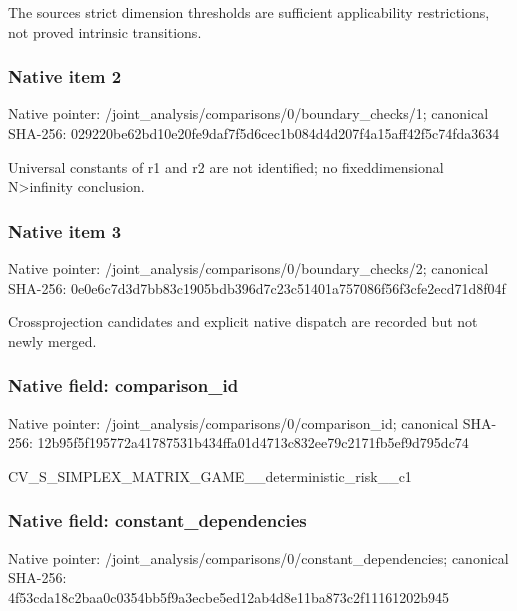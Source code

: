 \documentclass[10pt,a4paper]{article}
\begin{document}
The sources strict dimension thresholds are sufficient applicability restrictions, not proved intrinsic transitions.


\subsubsection{Native item 2}


Native pointer: /joint\_analysis/comparis\allowbreak{}ons/0/boundary\_checks/1; canonical SHA-256: 029220be62bd10e20fe9daf7\allowbreak{}f5d6cec1b084d4d207f4a15a\allowbreak{}ff42f5c74fda3634


Universal constants of r1 and r2 are not identified; no fixeddimensional N>infinity conclusion.


\subsubsection{Native item 3}


Native pointer: /joint\_analysis/comparis\allowbreak{}ons/0/boundary\_checks/2; canonical SHA-256: 0e0e6c7d3d7bb83c1905bdb3\allowbreak{}96d7c23c51401a757086f56f\allowbreak{}3cfe2ecd71d8f04f


Crossprojection candidates and explicit native dispatch are recorded but not newly merged.


\subsubsection{Native field: comparison\_id}


Native pointer: /joint\_analysis/comparis\allowbreak{}ons/0/comparison\_id; canonical SHA-256: 12b95f5f195772a41787531b\allowbreak{}434ffa01d4713c832ee79c21\allowbreak{}71fb5ef9d795dc74


CV\_S\_SIMPLEX\_MATRIX\_GAME\allowbreak{}\_\_deterministic\_risk\_\_c1


\subsubsection{Native field: constant\_dependencies}


Native pointer: /joint\_analysis/comparis\allowbreak{}ons/0/constant\_dependenc\allowbreak{}ies; canonical SHA-256: 4f53cda18c2baa0c0354bb5f\allowbreak{}9a3ecbe5ed12ab4d8e11ba87\allowbreak{}3c2f11161202b945
\end{document}
